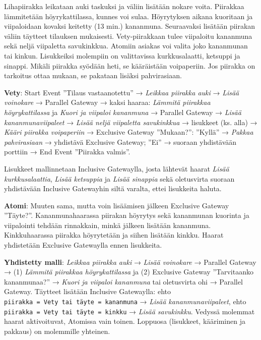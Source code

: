 \documentclass[
  finnish,
  letterpaper,
  DIV=11,
  numbers=noendperiod,
  oneside]{scrreprt}
\begin{document}
Lihapiirakka leikataan auki taskuksi ja väliin lisätään nokare voita.
Piirakkaa lämmitetään höyrykattilassa, kunnes voi sulaa. Höyrytyksen
aikana kuoritaan ja viipaloidaan kovaksi keitetty (13 min.) kananmuna.
Seuraavaksi lisätään piirakan väliin täytteet tilauksen mukaisesti.
Vety-piirakkaan tulee viipaloitu kananmuna sekä neljä viipaletta
savukinkkua. Atomiin asiakas voi valita joko kananmunan tai kinkun.
Lisukkeiksi molempiin on valittavissa kurkkusalaatti, ketsuppi ja
sinappi. Mikäli piirakka syödään heti, se kääräistään voipaperiin. Jos
piirakka on tarkoitus ottaa mukaan, se pakataan lisäksi pahvirasiaan.

\begin{tcolorbox}[enhanced jigsaw, arc=.35mm, bottomrule=.15mm, bottomtitle=1mm, breakable, colback=white, colbacktitle=quarto-callout-tip-color!10!white, colframe=quarto-callout-tip-color-frame, coltitle=black, left=2mm, leftrule=.75mm, opacityback=0, opacitybacktitle=0.6, rightrule=.15mm, title=\textcolor{quarto-callout-tip-color}{\faLightbulb}\hspace{0.5em}{Malliratkaisu}, titlerule=0mm, toprule=.15mm, toptitle=1mm]

\textbf{Vety}: Start Event ''Tilaus vastaanotettu'' → \emph{Leikkaa
piirakka auki} → \emph{Lisää voinokare} → Parallel Gateway → kaksi
haaraa: \emph{Lämmitä piirakkaa höyrykattilassa} ja \emph{Kuori ja
viipaloi kananmuna} → Parallel Gateway → \emph{Lisää kananmunaviipaleet}
→ \emph{Lisää neljä viipaletta savukinkkua} → lisukkeet (ks. alla) →
\emph{Kääri piirakka voipaperiin} → Exclusive Gateway ''Mukaan?'':
''Kyllä'' → \emph{Pakkaa pahvirasiaan} → yhdistävä Exclusive Gateway;
''Ei'' → suoraan yhdistävään porttiin → End Event ''Piirakka valmis''.

Lisukkeet mallinnetaan Inclusive Gatewaylla, josta lähtevät haarat
\emph{Lisää kurkkusalaattia}, \emph{Lisää ketsuppia} ja \emph{Lisää
sinappia} sekä oletusvirta suoraan yhdistävään Inclusive Gatewayhin
siltä varalta, ettei lisukkeita haluta.

\textbf{Atomi}: Muuten sama, mutta voin lisäämisen jälkeen Exclusive
Gateway ''Täyte?''. Kananmunahaarassa piirakan höyrytys sekä kananmunan
kuorinta ja viipalointi tehdään rinnakkain, minkä jälkeen lisätään
kananmuna. Kinkkuhaarassa piirakka höyrytetään ja siihen lisätään
kinkku. Haarat yhdistetään Exclusive Gatewaylla ennen lisukkeita.

\textbf{Yhdistetty malli}: \emph{Leikkaa piirakka auki} → \emph{Lisää
voinokare} → Parallel Gateway → (1) \emph{Lämmitä piirakkaa
höyrykattilassa} ja (2) Exclusive Gateway ''Tarvitaanko kananmunaa?'' →
\emph{Kuori ja viipaloi kananmuna} tai oletusvirta ohi → Parallel
Gateway. Täytteet lisätään Inclusive Gatewaylla: ehto
\texttt{piirakka\ =\ Vety\ tai\ täyte\ =\ kananmuna} → \emph{Lisää
kananmunaviipaleet}, ehto
\texttt{piirakka\ =\ Vety\ tai\ täyte\ =\ kinkku} → \emph{Lisää
savukinkku}. Vedyssä molemmat haarat aktivoituvat, Atomissa vain toinen.
Loppuosa (lisukkeet, kääriminen ja pakkaus) on molemmille yhteinen.


\end{tcolorbox}
\end{document}
